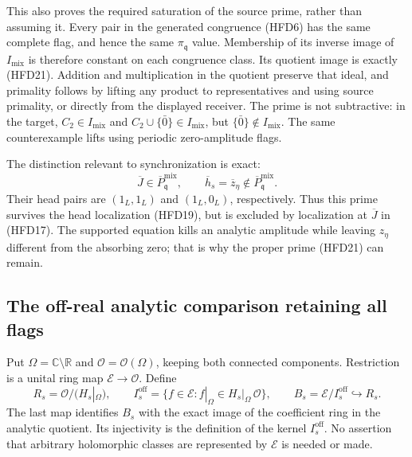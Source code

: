 This also proves the required saturation of
the source prime, rather than assuming it.
Every pair in the generated congruence (HFD6)
has the same complete flag, and hence the same
$\pi_{\mathfrak q}$ value. Membership of its
inverse image of $I_{\mathrm{mix}}$ is therefore
constant on each congruence class.
Its quotient image is exactly (HFD21).
Addition and multiplication in the quotient
preserve that ideal, and primality follows by
lifting any product to representatives and
using source primality, or directly from the
displayed receiver. The prime is not subtractive:
in the target, $C_2\in I_{\mathrm{mix}}$ and
$C_2\cup\{\bar0\}\in I_{\mathrm{mix}}$, but
$\{\bar0\}\notin I_{\mathrm{mix}}$.
The same counterexample lifts using periodic
zero-amplitude flags.

The distinction relevant to synchronization is
exact:
\begin{equation}\tag{HFD22}
 \overline J\in\overline P^{\mathrm{mix}}_{\mathfrak q},
 \qquad
 \overline h_s=\overline z_\eta
        \notin\overline P^{\mathrm{mix}}_{\mathfrak q}.
\end{equation}
Their head pairs are $(1_L,1_L)$ and
$(1_L,0_L)$, respectively.
Thus this prime survives the head localization
(HFD19), but is excluded by localization at
$\overline J$ in (HFD17).
The supported equation kills an analytic
amplitude while leaving $z_\eta$ different
from the absorbing zero; that is why the
proper prime (HFD21) can remain.

\subsection{The off-real analytic comparison retaining all flags}

Put $\Omega=\mathbb C\setminus\mathbb R$ and
$\mathcal O=\mathcal O(\Omega)$, keeping both
connected components. Restriction is a unital
ring map $\mathcal E\to\mathcal O$.
Define
\begin{equation}\tag{HFD23}
 R_s=\mathcal O/(H_s|_\Omega),\qquad
 I_s^{\mathrm{off}}
   =\{f\in\mathcal E:f|_\Omega\in
                           H_s|_\Omega\,\mathcal O\},\qquad
 B_s=\mathcal E/I_s^{\mathrm{off}}
          \hookrightarrow R_s .
\end{equation}
The last map identifies $B_s$ with the exact
image of the coefficient ring in the analytic
quotient. Its injectivity is the definition
of the kernel $I_s^{\mathrm{off}}$.
No assertion that arbitrary holomorphic
classes are represented by $\mathcal E$
is needed or made.

